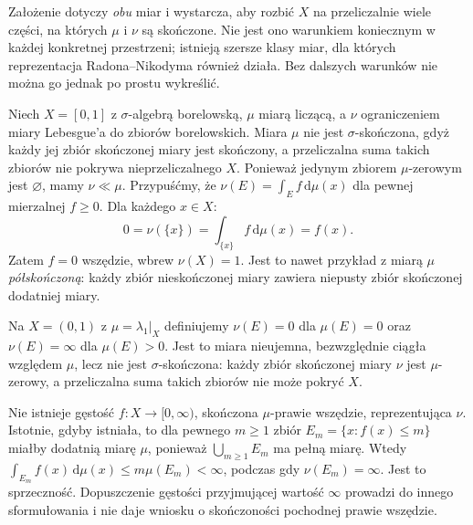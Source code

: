 \begin{uwaga}
Założenie dotyczy \emph{obu} miar i wystarcza, aby rozbić
$X$ na przeliczalnie wiele części, na których
$\mu$ i $\nu$ są skończone. Nie jest ono warunkiem
koniecznym w każdej konkretnej przestrzeni;
istnieją szersze klasy miar, dla których reprezentacja
Radona--Nikodyma również działa. Bez dalszych warunków
nie można go jednak po prostu wykreślić.
\end{uwaga}

\begin{przyklad}
\label{ex:RN-failure-nonsigma-18}
Niech $X=[0,1]$ z $\sigma$-algebrą borelowską,
$\mu$ miarą liczącą, a $\nu$ ograniczeniem miary
Lebesgue'a do zbiorów borelowskich. Miara $\mu$
nie jest $\sigma$-skończona, gdyż każdy jej zbiór
skończonej miary jest skończony, a przeliczalna suma
takich zbiorów nie pokrywa nieprzeliczalnego $X$.
Ponieważ jedynym zbiorem $\mu$-zerowym jest $\varnothing$,
mamy $\nu\ll\mu$. Przypuśćmy, że
$\nu(E)=\int_Ef\,\mathrm d\mu(x)$ dla pewnej
mierzalnej $f\ge0$. Dla każdego $x\in X$:
\[
0=\nu(\{x\})=\int_{\{x\}}f\,\mathrm d\mu(x)=f(x).
\]
Zatem $f=0$ wszędzie, wbrew
$\nu(X)=1$. Jest to nawet przykład z miarą $\mu$
\emph{półskończoną}: każdy zbiór nieskończonej miary
zawiera niepusty zbiór skończonej dodatniej miary.
\end{przyklad}

\begin{przyklad}
Na $X=(0,1)$ z $\mu=\lambda_1|_X$ definiujemy
$\nu(E)=0$ dla $\mu(E)=0$ oraz
$\nu(E)=\infty$ dla $\mu(E)>0$.
Jest to miara nieujemna, bezwzględnie ciągła względem
$\mu$, lecz nie jest $\sigma$-skończona: każdy zbiór
skończonej miary $\nu$ jest $\mu$-zerowy, a przeliczalna
suma takich zbiorów nie może pokryć $X$.

Nie istnieje gęstość $f:X\to[0,\infty)$, skończona
$\mu$-prawie wszędzie, reprezentująca $\nu$.
Istotnie, gdyby istniała, to dla pewnego $m\ge1$
zbiór $E_m=\{x:f(x)\le m\}$ miałby dodatnią miarę
$\mu$, ponieważ $\bigcup_{m\ge1}E_m$ ma pełną miarę.
Wtedy
$\int_{E_m}f(x)\,\mathrm d\mu(x)\le m\mu(E_m)<\infty$,
podczas gdy $\nu(E_m)=\infty$. Jest to sprzeczność.
Dopuszczenie gęstości przyjmującej wartość $\infty$
prowadzi do innego sformułowania i nie daje wniosku
o skończoności pochodnej prawie wszędzie.
\end{przyklad}

